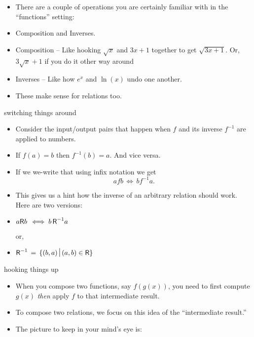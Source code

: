 \documentclass[handout,landscape]{beamer}
\begin{document}
\begin{frame}{}
\begin{itemize}
\item There are a couple of operations you are certainly familiar with in the ``functions'' setting:\pause
\item Composition and Inverses. \pause
\item Composition -- Like hooking $\sqrt{x}$ and $3x+1$ together to get $\sqrt{3x+1}$. \pause \newline
Or, $3\sqrt{x}+1$ if you do it other way around\textellipsis \pause 
\item Inverses -- Like how $e^x$ and $\ln{(x)}$ undo one another. \pause
\item These make sense for relations too.
\end{itemize}
\end{frame}

\begin{frame}{switching things around}
\begin{itemize}
\item Consider the input/output pairs that happen when $f$ and its inverse $f^{-1}$ are applied to numbers. \pause
\item If $f(a) = b$ then $f^{-1}(b) = a$.  \pause And vice versa. \pause
\item If we we-write that using infix notation we get 
\[ afb \, \iff \, bf^{-1}a. \] \pause
\item This gives us a hint how the inverse of an arbitrary relation should work. \newline
Here are two versions: \pause
\item $\displaystyle a \mbox{\textsf R} b \, \iff b \, \mbox{\textsf R}^{-1} a$ \pause

\centerline{or,} \pause

\item $\displaystyle \relR^{-1} \, = \, \{ (b,a) \suchthat (a,b) \in \relR \}$ \pause
\end{itemize}
\end{frame}

\begin{frame}{hooking things up}
\begin{itemize}
\item When you compose two functions, say $f(g(x))$, you need to first compute $g(x)$ \pause \newline
{\em then} apply $f$ to that intermediate result. \pause
\item To compose two relations, we focus on this idea of the ``intermediate result.'' \pause
\item The picture to keep in your mind's eye is: \pause

\begin{center}

\end{center}

\end{itemize}
\end{frame}
\end{document}
